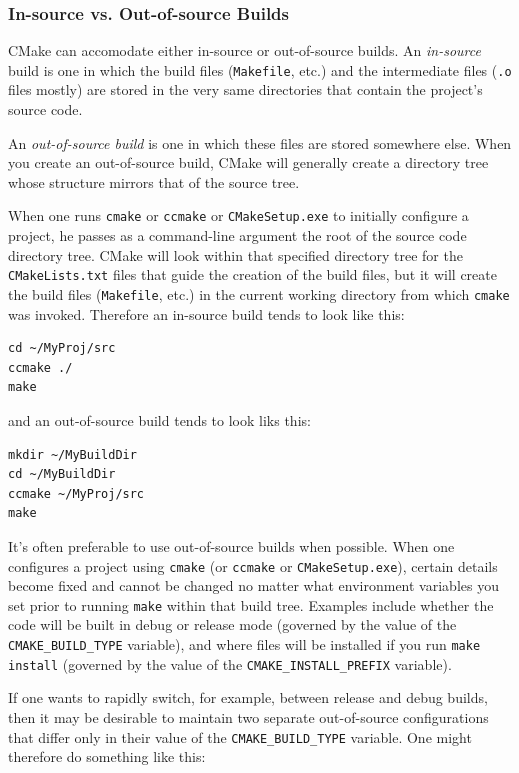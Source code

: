\documentclass[letterpaper,10pt]{article}
\begin{document}
\subsubsection{In-source vs. Out-of-source Builds}
CMake can accomodate either in-source or out-of-source builds.  An 
\textit{in-source} build is one in which the build files (\verb|Makefile|, etc.)
and the intermediate files (\verb|.o| files mostly) are stored in the very same
directories that contain the project's source code.  

An \textit{out-of-source build} is one in which these files are stored somewhere
else.  When you create an out-of-source build, CMake will generally create a
directory tree whose structure mirrors that of the source tree.

When one runs \verb|cmake| or \verb|ccmake| or \verb|CMakeSetup.exe| to initially
configure a project, he passes as a command-line argument the root of the source 
code directory tree.  CMake will look within that specified directory tree for
the \verb|CMakeLists.txt| files that guide the creation of the build files, but
it will create the build files (\verb|Makefile|, etc.) in the current working 
directory from which \verb|cmake| was invoked.  Therefore an in-source build
tends to look like this:
\begin{verbatim}
cd ~/MyProj/src
ccmake ./
make
\end{verbatim} 

and an out-of-source build tends to look liks this:
\begin{verbatim}
mkdir ~/MyBuildDir
cd ~/MyBuildDir
ccmake ~/MyProj/src
make
\end{verbatim} 


It's often preferable to use out-of-source builds when possible.  When one
configures a project using \verb|cmake| (or \verb|ccmake| or 
\verb|CMakeSetup.exe|), certain details become fixed and cannot be changed
no matter what environment variables you set prior to running \verb|make|
within that build tree.  Examples include whether the code will be built
in debug or release mode (governed by the value of the \verb|CMAKE_BUILD_TYPE|
variable), and where files will be installed if you run \verb|make install|
(governed by the value of the \verb|CMAKE_INSTALL_PREFIX| variable).  

If one wants to rapidly switch, for example, between release and debug builds,
then it may be desirable to maintain two separate out-of-source configurations
that differ only in their value of the \verb|CMAKE_BUILD_TYPE| variable.  One
might therefore do something like this:
\end{document}
